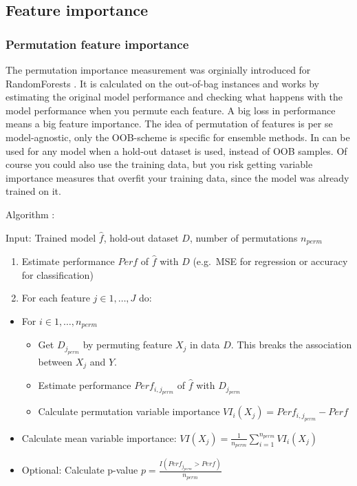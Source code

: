 \documentclass[12pt,]{krantz}
\providecommand{\tightlist}{%
  \setlength{\itemsep}{0pt}\setlength{\parskip}{0pt}}
\theoremstyle{definition}
\theoremstyle{definition}
\theoremstyle{definition}
\theoremstyle{remark}
\begin{document}
\subsection{Feature importance}\label{feature-importance}

\subsubsection{Permutation feature
importance}\label{permutation-feature-importance}

The permutation importance measurement was orginially introduced for
RandomForests \citep{breiman2001random}. It is calculated on the
out-of-bag instances and works by estimating the original model
performance and checking what happens with the model performance when
you permute each feature. A big loss in performance means a big feature
importance. The idea of permutation of features is per se
model-agnostic, only the OOB-scheme is specific for ensemble methods. In
can be used for any model when a hold-out dataset is used, instead of
OOB samples. Of course you could also use the training data, but you
risk getting variable importance measures that overfit your training
data, since the model was already trained on it.

Algorithm \citep{breiman2001random}:

Input: Trained model \(\hat{f}\), hold-out dataset \(D\), number of
permutations \(n_{perm}\)

\begin{enumerate}
\def\labelenumi{\arabic{enumi}.}
\tightlist
\item
  Estimate performance \(Perf\) of \(\hat{f}\) with \(D\) (e.g.~MSE for
  regression or accuracy for classification)
\item
  For each feature \(j \in 1, \ldots, J\) do:
\end{enumerate}

\begin{itemize}
\tightlist
\item
  For \(i \in 1,\ldots , n_{perm}\)

  \begin{itemize}
  \tightlist
  \item
    Get \(D_{j_{perm}}\) by permuting feature \(X_j\) in data \(D\).
    This breaks the association between \(X_j\) and \(Y\).
  \item
    Estimate performance \(Perf_{i,j_{perm}}\) of \(\hat{f}\) with
    \(D_{j_{perm}}\)
  \item
    Calculate permutation variable importance
    \(VI_i(X_j) = Perf_{i,j_{perm}} - Perf\)
  \end{itemize}
\item
  Calculate mean variable importance:
  \(VI(X_j) = \frac{1}{n_{perm}}\sum_{i=1}^{n_{perm}} VI_i(X_j)\)
\item
  Optional: Calculate p-value
  \(p = \frac{I(Perf_{j_{perm}} > Perf)}{n_{perm}}\)
\end{itemize}
\end{document}
